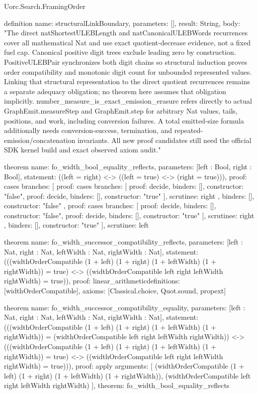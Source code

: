 \begin{lexlean}{Uorc.Search.FramingOrder}
\begin{semanticmodule}
definition{
  name: structuralLinkBoundary,
  parameters: [],
  result: String,
  body: "The direct natShortestULEBLength and natCanonicalULEBWords recurrences cover all mathematical Nat and use exact quotient-decrease evidence, not a fixed fuel cap. Canonical positive digit trees exclude leading zero by construction. PositiveULEBPair synchronizes both digit chains so structural induction proves order compatibility and monotonic digit count for unbounded represented values. Linking that structural representation to the direct quotient recurrences remains a separate adequacy obligation; no theorem here assumes that obligation implicitly. number_measure_is_exact_emission_erasure refers directly to actual GraphEmit.measureStep and GraphEmit.step for arbitrary Nat values, tails, positions, and work, including conversion failures. A total emitted-size formula additionally needs conversion-success, termination, and repeated-emission/concatenation invariants. All new proof candidates still need the official SDK kernel build and exact observed axiom audit."
}

theorem{
  name: fo_width_bool_equality_reflects,
  parameters: [left : Bool, right : Bool],
  statement: ((left = right) <-> ((left = true) <-> (right = true))),
  proof: cases{
    branches: [
      {
        proof: cases{
          branches: [
            {proof: decide{}, binders: [], constructor: "false"},
            {proof: decide{}, binders: [], constructor: "true"}
          ],
          scrutinee: right
        },
        binders: [],
        constructor: "false"
      },
      {
        proof: cases{
          branches: [
            {proof: decide{}, binders: [], constructor: "false"},
            {proof: decide{}, binders: [], constructor: "true"}
          ],
          scrutinee: right
        },
        binders: [],
        constructor: "true"
      }
    ],
    scrutinee: left
  }
}

theorem{
  name: fo_width_successor_compatibility_reflects,
  parameters: [left : Nat, right : Nat, leftWidth : Nat, rightWidth : Nat],
  statement: (((widthOrderCompatible (1 + left) (1 + right) (1 + leftWidth) (1 + rightWidth)) = true) <-> ((widthOrderCompatible left right leftWidth rightWidth) = true)),
  proof: linear_arithmetic{definitions: [widthOrderCompatible]},
  axioms: [Classical.choice, Quot.sound, propext]
}

theorem{
  name: fo_width_successor_compatibility_equality,
  parameters: [left : Nat, right : Nat, leftWidth : Nat, rightWidth : Nat],
  statement: (((widthOrderCompatible (1 + left) (1 + right) (1 + leftWidth) (1 + rightWidth)) = (widthOrderCompatible left right leftWidth rightWidth)) <-> (((widthOrderCompatible (1 + left) (1 + right) (1 + leftWidth) (1 + rightWidth)) = true) <-> ((widthOrderCompatible left right leftWidth rightWidth) = true))),
  proof: apply{
    arguments: [
      (widthOrderCompatible (1 + left) (1 + right) (1 + leftWidth) (1 + rightWidth)),
      (widthOrderCompatible left right leftWidth rightWidth)
    ],
    theorem: fo_width_bool_equality_reflects
  }
}


\end{semanticmodule}
\end{lexlean}
